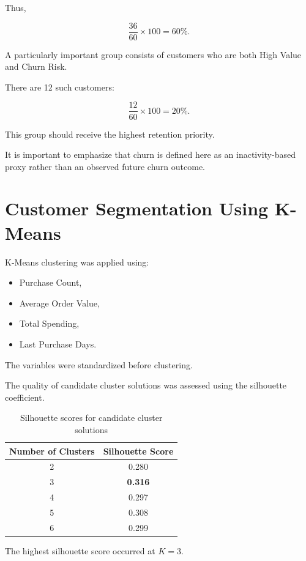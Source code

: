 \documentclass[11pt,a4paper]{article}
\begin{document}
Thus,

\[
\frac{36}{60}\times100=60\%.
\]

A particularly important group consists of customers who are both High Value and Churn Risk.

There are 12 such customers:

\[
\frac{12}{60}\times100=20\%.
\]

This group should receive the highest retention priority.

It is important to emphasize that churn is defined here as an inactivity-based proxy rather than an observed future churn outcome.


\section{Customer Segmentation Using K-Means}

K-Means clustering was applied using:

\begin{itemize}
    \item Purchase Count,
    \item Average Order Value,
    \item Total Spending,
    \item Last Purchase Days.
\end{itemize}

The variables were standardized before clustering.

The quality of candidate cluster solutions was assessed using the silhouette coefficient.

\begin{table}[H]
\centering
\caption{Silhouette scores for candidate cluster solutions}
\label{tab:silhouette}
\begin{tabular}{cc}
\toprule
\textbf{Number of Clusters} & \textbf{Silhouette Score}\\
\midrule
2 & 0.280\\
3 & \textbf{0.316}\\
4 & 0.297\\
5 & 0.308\\
6 & 0.299\\
\bottomrule
\end{tabular}
\end{table}

The highest silhouette score occurred at $K=3$.
\end{document}
